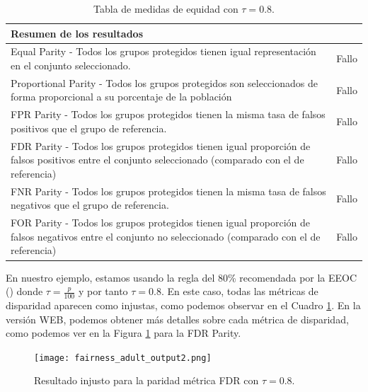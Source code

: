 \begin{table}[h]
\centering
\resizebox{17.cm}{!} {
\begin{tabular}{ll}
\textbf{Resumen de los resultados}                                                                                                                              &                              \\ \hline
Equal Parity - Todos los grupos protegidos tienen igual representación en el conjunto seleccionado.                                                     & {\color[HTML]{FE0000} Fallo} \\
Proportional Parity - Todos los grupos protegidos son seleccionados de forma proporcional a su porcentaje de la población                               & {\color[HTML]{FE0000} Fallo} \\
FPR Parity - Todos los grupos protegidos tienen la misma tasa de falsos positivos que el grupo de referencia.                                           & {\color[HTML]{FE0000} Fallo} \\
FDR Parity - Todos los grupos protegidos tienen igual proporción de falsos positivos entre el conjunto seleccionado (comparado con el de referencia)    & {\color[HTML]{FE0000} Fallo} \\
FNR Parity - Todos los grupos protegidos tienen la misma tasa de falsos negativos que el grupo de referencia.                                           & {\color[HTML]{FE0000} Fallo} \\
FOR Parity - Todos los grupos protegidos tienen igual proporción de falsos negativos entre el conjunto no seleccionado (comparado con el de referencia) & {\color[HTML]{FE0000} Fallo}
\end{tabular}
}
	\caption{Tabla de medidas de equidad con $\tau=0.8$.}
    \label{fig:medequmbral}
\end{table}

En nuestro ejemplo, estamos usando la regla del 80\% recomendada por la EEOC (\cite{adverse2009}) donde $\tau=\frac{p}{100}$ y por tanto $\tau=0.8$. En este caso, todas las métricas de disparidad aparecen como injustas, como podemos observar en el Cuadro \ref{fig:medequmbral}. En la versión WEB, podemos obtener más detalles sobre cada métrica de disparidad, como podemos ver en la Figura \ref{fig:ejunfairaq2} para la FDR Parity.

\begin{figure}[h]
	\centering
	\texttt{[image: fairness\_adult\_output2.png]}
	\caption{Resultado injusto para la paridad métrica FDR con $\tau=0.8$.}
    \label{fig:ejunfairaq2}
\end{figure}

